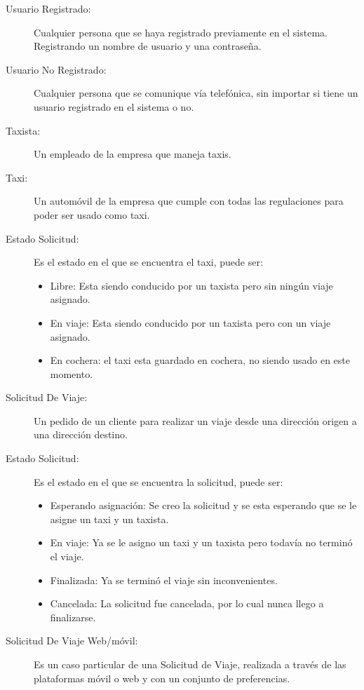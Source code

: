 \documentclass[a4paper, 10pt, twoside]{article}
\begin{document}
\begin{description}
  \item[Usuario Registrado:] Cualquier persona que se haya registrado previamente en el sistema. Registrando un nombre de usuario y una contraseña.

  \item[Usuario No Registrado:] Cualquier persona que se comunique vía telefónica, sin importar si tiene un usuario registrado en el sistema o no.

  \item[Taxista:] Un empleado de la empresa que maneja taxis.

  \item[Taxi:] Un automóvil de la empresa que cumple con todas las regulaciones para poder ser usado como taxi.
  
   \item[Estado Solicitud:] Es el estado en el que se encuentra el taxi, puede ser:
    \begin{itemize}
     \item Libre: Esta siendo conducido por un taxista pero sin ning\'un viaje asignado.
     \item En viaje: Esta siendo conducido por un taxista pero con un viaje asignado.
     \item En cochera: el taxi esta guardado en cochera, no siendo usado en este momento.
    \end{itemize}
  
  \item[Solicitud De Viaje:] Un pedido de un cliente para realizar un viaje desde una dirección origen a una dirección destino.
  
  \item[Estado Solicitud:] Es el estado en el que se encuentra la solicitud, puede ser:
    \begin{itemize}
     \item Esperando asignación: Se creo la solicitud y se esta esperando que se le asigne un taxi y un taxista.
     \item En viaje: Ya se le asigno un taxi y un taxista pero todav\'ia no termin\'o el viaje.
     \item Finalizada: Ya se terminó el viaje sin inconvenientes.
     \item Cancelada: La solicitud fue cancelada, por lo cual nunca llego a finalizarse.
    \end{itemize}


  \item[Solicitud De Viaje Web/móvil:] Es un caso particular de una Solicitud de Viaje, realizada a través de las plataformas móvil o web y con un conjunto de preferencias.


\end{description}
\end{document}

